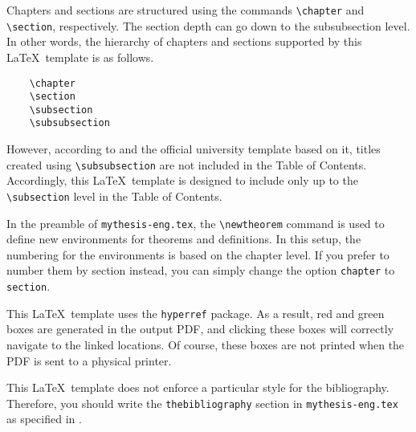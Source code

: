 Chapters and sections are structured using the commands \verb|\chapter| and \verb|\section|, respectively.
The section depth can go down to the subsubsection level.
In other words, the hierarchy of chapters and sections supported by this \LaTeX~template is as follows.
\begin{verbatim}
	\chapter
	\section
	\subsection
	\subsubsection
\end{verbatim}
However, according to \cite{ThesisGuide} and the official university template \cite{ThesisTemplate} based on it, titles created using \verb|\subsubsection| are not included in the Table of Contents.
Accordingly, this \LaTeX~template is designed to include only up to the \verb|\subsection| level in the Table of Contents.

In the preamble of \verb|mythesis-eng.tex|, the \verb|\newtheorem| command is used to define new environments for theorems and definitions.
In this setup, the numbering for the environments is based on the chapter level.
If you prefer to number them by section instead, you can simply change the option \verb|chapter| to \verb|section|.

This \LaTeX~template uses the \verb|hyperref| package.
As a result, red and green boxes are generated in the output PDF, and clicking these boxes will correctly navigate to the linked locations.
Of course, these boxes are not printed when the PDF is sent to a physical printer.

This \LaTeX~template does not enforce a particular style for the bibliography.
Therefore, you should write the \verb|thebibliography| section in \verb|mythesis-eng.tex| as specified in \cite{ThesisGuide}.
